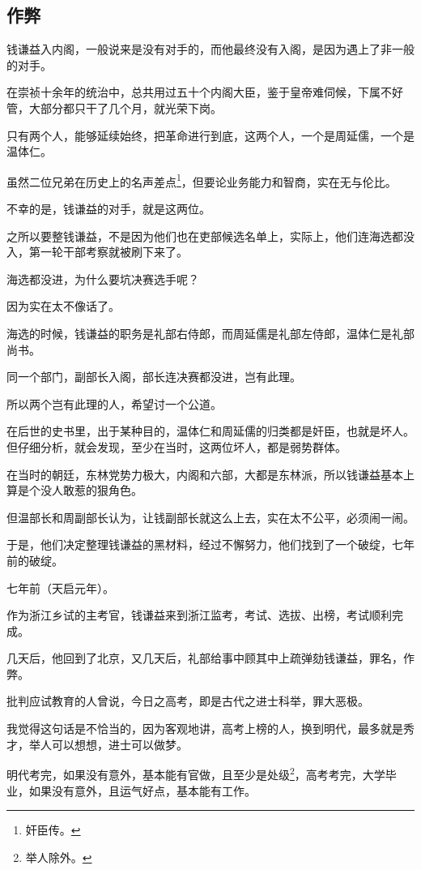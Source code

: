\begin{multicols}{\theparacolNo}
\subsection{作弊}
钱谦益入内阁，一般说来是没有对手的，而他最终没有入阁，是因为遇上了非一般的对手。

在崇祯十余年的统治中，总共用过五十个内阁大臣，鉴于皇帝难伺候，下属不好管，大部分都只干了几个月，就光荣下岗。

只有两个人，能够延续始终，把革命进行到底，这两个人，一个是周延儒，一个是温体仁。

虽然二位兄弟在历史上的名声差点\footnote{奸臣传。}，但要论业务能力和智商，实在无与伦比。

不幸的是，钱谦益的对手，就是这两位。

之所以要整钱谦益，不是因为他们也在吏部候选名单上，实际上，他们连海选都没入，第一轮干部考察就被刷下来了。

海选都没进，为什么要坑决赛选手呢？

因为实在太不像话了。

海选的时候，钱谦益的职务是礼部右侍郎，而周延儒是礼部左侍郎，温体仁是礼部尚书。

同一个部门，副部长入阁，部长连决赛都没进，岂有此理。

所以两个岂有此理的人，希望讨一个公道。

在后世的史书里，出于某种目的，温体仁和周延儒的归类都是奸臣，也就是坏人。但仔细分析，就会发现，至少在当时，这两位坏人，都是弱势群体。

在当时的朝廷，东林党势力极大，内阁和六部，大都是东林派，所以钱谦益基本上算是个没人敢惹的狠角色。

但温部长和周副部长认为，让钱副部长就这么上去，实在太不公平，必须闹一闹。

于是，他们决定整理钱谦益的黑材料，经过不懈努力，他们找到了一个破绽，七年前的破绽。

七年前（天启元年）。

作为浙江乡试的主考官，钱谦益来到浙江监考，考试、选拔、出榜，考试顺利完成。

几天后，他回到了北京，又几天后，礼部给事中顾其中上疏弹劾钱谦益，罪名，作弊。

批判应试教育的人曾说，今日之高考，即是古代之进士科举，罪大恶极。

我觉得这句话是不恰当的，因为客观地讲，高考上榜的人，换到明代，最多就是秀才，举人可以想想，进士可以做梦。

明代考完，如果没有意外，基本能有官做，且至少是处级\footnote{举人除外。}，高考考完，大学毕业，如果没有意外，且运气好点，基本能有工作。


\end{multicols}
